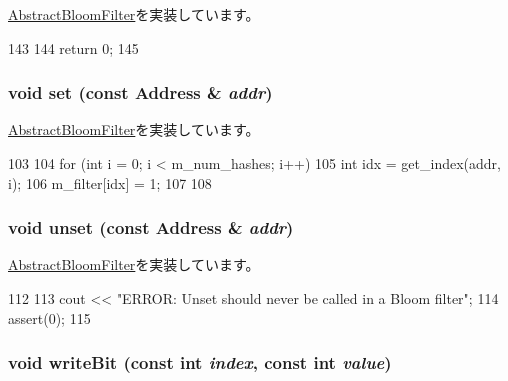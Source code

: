 \hyperlink{classAbstractBloomFilter_a6c0e9a098f0f210aa42eb2f1553804eb}{AbstractBloomFilter}を実装しています。


\begin{DoxyCode}
143 {
144     return 0;
145 }
\end{DoxyCode}
\hypertarget{classMultiBitSelBloomFilter_a2b666fae2a5c2b98bc5cba8e1333bcc9}{
\subsubsection[{set}]{\setlength{\rightskip}{0pt plus 5cm}void set (const {\bf Address} \& {\em addr})}}
\label{classMultiBitSelBloomFilter_a2b666fae2a5c2b98bc5cba8e1333bcc9}


\hyperlink{classAbstractBloomFilter_a54e1262ae5f60efeb8714d0556b3c32e}{AbstractBloomFilter}を実装しています。


\begin{DoxyCode}
103 {
104     for (int i = 0; i < m_num_hashes; i++) {
105         int idx = get_index(addr, i);
106         m_filter[idx] = 1;
107     }
108 }
\end{DoxyCode}
\hypertarget{classMultiBitSelBloomFilter_a69b772787ea61467af679e3aa5406b41}{
\subsubsection[{unset}]{\setlength{\rightskip}{0pt plus 5cm}void unset (const {\bf Address} \& {\em addr})}}
\label{classMultiBitSelBloomFilter_a69b772787ea61467af679e3aa5406b41}


\hyperlink{classAbstractBloomFilter_a0a35d1c7bad19fe9362068a0d319ec5f}{AbstractBloomFilter}を実装しています。


\begin{DoxyCode}
112 {
113     cout << "ERROR: Unset should never be called in a Bloom filter";
114     assert(0);
115 }
\end{DoxyCode}
\hypertarget{classMultiBitSelBloomFilter_ac188318778d26b44f567c5b530598c16}{
\subsubsection[{writeBit}]{\setlength{\rightskip}{0pt plus 5cm}void writeBit (const int {\em index}, \/  const int {\em value})}}
\label{classMultiBitSelBloomFilter_ac188318778d26b44f567c5b530598c16}


